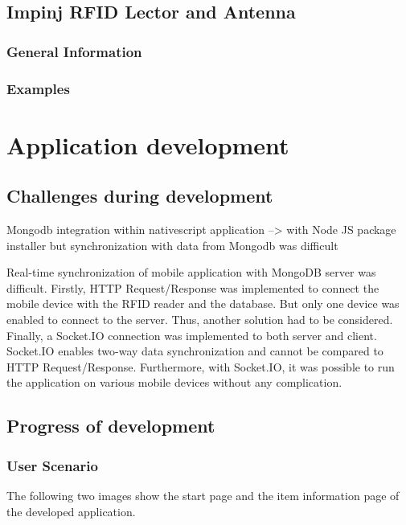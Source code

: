 \subsection{Impinj RFID Lector and Antenna}

\subsubsection{General Information}

\subsubsection{Examples}

%
%
\section{Application development} \label{app_development}

\subsection{Challenges during development}

Mongodb integration within nativescript application 
--> with Node JS package installer 
but synchronization with data from Mongodb was difficult

Real-time synchronization of mobile application with MongoDB server was difficult. Firstly, HTTP Request/Response was implemented to connect the mobile device with the RFID reader and the database. But only one device was enabled to connect to the server. Thus, another solution had to be considered. Finally, a Socket.IO connection was implemented to both server and client. Socket.IO enables two-way data synchronization and cannot be compared to HTTP Request/Response. Furthermore, with Socket.IO, it was possible to run the application on various mobile devices without any complication. 

\subsection{Progress of development}

\subsubsection{User Scenario}

The following two images show the start page and the item information page of the developed application. 


